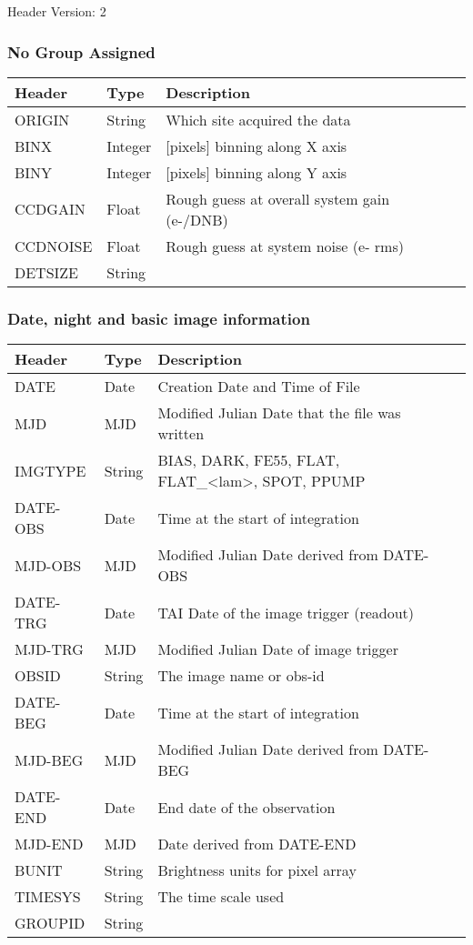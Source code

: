 Header Version: 2

\subsubsection{No Group Assigned}
\begin{tabular}{l l l l l}

\hline
Header & Type & Description \\
\hline
ORIGIN & String & Which site acquired the data \\
BINX & Integer & [pixels] binning along X axis \\
BINY & Integer & [pixels] binning along Y axis \\
CCDGAIN & Float & Rough guess at overall system gain (e-/DNB) \\
CCDNOISE & Float & Rough guess at system noise (e- rms) \\
DETSIZE & String &  \\
\hline
\end{tabular}


\subsubsection{Date, night and basic image information}
\begin{tabular}{l l l l l}

\hline
Header & Type & Description \\
\hline
DATE & Date & Creation Date and Time of File \\
MJD & MJD & Modified Julian Date that the file was written \\
IMGTYPE & String & BIAS, DARK, FE55, FLAT, FLAT\_<lam>, SPOT, PPUMP \\
DATE-OBS & Date & Time at the start of integration \\
MJD-OBS & MJD & Modified Julian Date derived from DATE-OBS \\
DATE-TRG & Date & TAI Date of the image trigger (readout) \\
MJD-TRG & MJD & Modified Julian Date of image trigger \\
OBSID & String & The image name or obs-id \\
DATE-BEG & Date & Time at the start of integration \\
MJD-BEG & MJD & Modified Julian Date derived from DATE-BEG \\
DATE-END & Date & End date of the observation \\
MJD-END & MJD & Date derived from DATE-END \\
BUNIT & String & Brightness units for pixel array \\
TIMESYS & String & The time scale used \\
GROUPID & String &  \\
\hline
\end{tabular}


